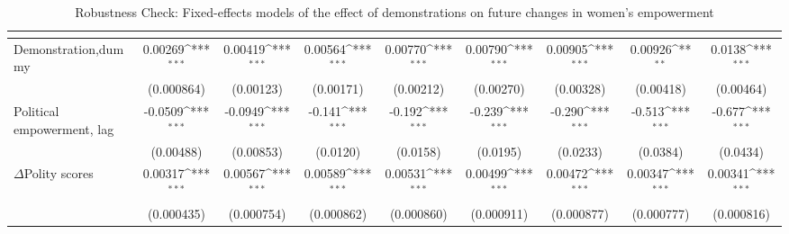 \begin{table}[htbp]\centering
\def\sym#1{\ifmmode^{#1}\else\(^{#1}\)\fi}
\caption{Robustness Check: Fixed-effects models of the effect of demonstrations on future changes in women's empowerment \label{polemdemonstrationnowar}}
\begin{tabular}{l*{8}{c}}
\hline\hline
                    &&&&&&&&\\
\hline
Demonstration,dummy &     0.00269\sym{***}&     0.00419\sym{***}&     0.00564\sym{***}&     0.00770\sym{***}&     0.00790\sym{***}&     0.00905\sym{***}&     0.00926\sym{**} &      0.0138\sym{***}\\
                    &  (0.000864)         &   (0.00123)         &   (0.00171)         &   (0.00212)         &   (0.00270)         &   (0.00328)         &   (0.00418)         &   (0.00464)         \\
[1em]
Political empowerment, lag    &     -0.0509\sym{***}&     -0.0949\sym{***}&      -0.141\sym{***}&      -0.192\sym{***}&      -0.239\sym{***}&      -0.290\sym{***}&      -0.513\sym{***}&      -0.677\sym{***}\\
                    &   (0.00488)         &   (0.00853)         &    (0.0120)         &    (0.0158)         &    (0.0195)         &    (0.0233)         &    (0.0384)         &    (0.0434)         \\
[1em]
$\Delta$Polity scores            &     0.00317\sym{***}&     0.00567\sym{***}&     0.00589\sym{***}&     0.00531\sym{***}&     0.00499\sym{***}&     0.00472\sym{***}&     0.00347\sym{***}&     0.00341\sym{***}\\
                    &  (0.000435)         &  (0.000754)         &  (0.000862)         &  (0.000860)         &  (0.000911)         &  (0.000877)         &  (0.000777)         &  (0.000816)         \\

\end{tabular}
\end{table}

